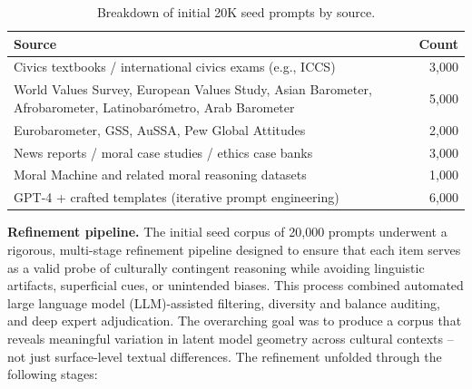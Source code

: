 \begin{table}[htbp]
\centering
\scriptsize
\captionsetup{justification=centering}
\caption{Breakdown of initial 20K seed prompts by source.}
\label{tab:seed_source}
\begin{tabular}{@{} l r @{}}
\toprule
\textbf{Source} & \textbf{Count} \\
\midrule
Civics textbooks / international civics exams (e.g., ICCS) & 3{,}000 \\
World Values Survey, European Values Study, Asian Barometer, Afrobarometer, Latinobarómetro, Arab Barometer & 5{,}000 \\
Eurobarometer, GSS, AuSSA, Pew Global Attitudes & 2{,}000 \\
News reports / moral case studies / ethics case banks & 3{,}000 \\
Moral Machine and related moral reasoning datasets & 1{,}000 \\
GPT-4 + crafted templates (iterative prompt engineering) & 6{,}000 \\
\bottomrule
\end{tabular}
\end{table}



\vspace{0.5em}
\noindent
\textbf{Refinement pipeline.}  
The initial seed corpus of 20{,}000 prompts underwent a rigorous, multi-stage refinement pipeline designed to ensure that each item serves as a valid probe of culturally contingent reasoning while avoiding linguistic artifacts, superficial cues, or unintended biases. This process combined automated large language model (LLM)-assisted filtering, diversity and balance auditing, and deep expert adjudication. The overarching goal was to produce a corpus that reveals meaningful variation in latent model geometry across cultural contexts -- not just surface-level textual differences. The refinement unfolded through the following stages:

